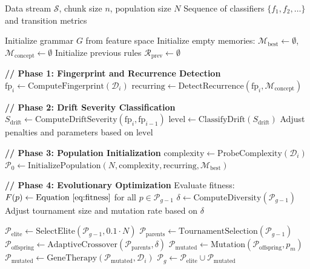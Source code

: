 \documentclass[lettersize,journal]{IEEEtran}
\begin{document}
\begin{algorithm}[!t]
\small
\caption{EGIS: Evolutionary Grammar for Interpretable Streams}
\label{alg:egis}
\begin{algorithmic}[1]
\REQUIRE Data stream $\mathcal{S}$, chunk size $n$, population size $N$
\ENSURE Sequence of classifiers $\{f_1, f_2, \ldots\}$ and transition metrics

\STATE Initialize grammar $G$ from feature space
\STATE Initialize empty memories: $\mathcal{M}_{\text{best}} \leftarrow \emptyset$, $\mathcal{M}_{\text{concept}} \leftarrow \emptyset$
\STATE Initialize previous rules $\mathcal{R}_{\text{prev}} \leftarrow \emptyset$

    \STATE \textbf{// Phase 1: Fingerprint and Recurrence Detection}
    \STATE $\text{fp}_i \leftarrow \text{ComputeFingerprint}(\mathcal{D}_i)$
    \STATE $\text{recurring} \leftarrow \text{DetectRecurrence}(\text{fp}_i, \mathcal{M}_{\text{concept}})$

    \STATE \textbf{// Phase 2: Drift Severity Classification}
    \STATE $S_{\text{drift}} \leftarrow \text{ComputeDriftSeverity}(\text{fp}_i, \text{fp}_{i-1})$
    \STATE $\text{level} \leftarrow \text{ClassifyDrift}(S_{\text{drift}})$
    \STATE Adjust penalties and parameters based on $\text{level}$

    \STATE \textbf{// Phase 3: Population Initialization}
    \STATE $\text{complexity} \leftarrow \text{ProbeComplexity}(\mathcal{D}_i)$
    \STATE $\mathcal{P}_0 \leftarrow \text{InitializePopulation}(N, \text{complexity}, \text{recurring}, \mathcal{M}_{\text{best}})$

    \STATE \textbf{// Phase 4: Evolutionary Optimization}
        \STATE Evaluate fitness: $F(p) \leftarrow \text{Equation~\ref{eq:fitness}}$ for all $p \in \mathcal{P}_{g-1}$
        \STATE $\delta \leftarrow \text{ComputeDiversity}(\mathcal{P}_{g-1})$
        \STATE Adjust tournament size and mutation rate based on $\delta$

        \STATE $\mathcal{P}_{\text{elite}} \leftarrow \text{SelectElite}(\mathcal{P}_{g-1}, 0.1 \cdot N)$
        \STATE $\mathcal{P}_{\text{parents}} \leftarrow \text{TournamentSelection}(\mathcal{P}_{g-1})$
        \STATE $\mathcal{P}_{\text{offspring}} \leftarrow \text{AdaptiveCrossover}(\mathcal{P}_{\text{parents}}, \delta)$
        \STATE $\mathcal{P}_{\text{mutated}} \leftarrow \text{Mutation}(\mathcal{P}_{\text{offspring}}, p_m)$
        \STATE $\mathcal{P}_{\text{mutated}} \leftarrow \text{GeneTherapy}(\mathcal{P}_{\text{mutated}}, \mathcal{D}_i)$
        \STATE $\mathcal{P}_g \leftarrow \mathcal{P}_{\text{elite}} \cup \mathcal{P}_{\text{mutated}}$


\end{algorithmic}
\end{algorithm}
\end{document}
